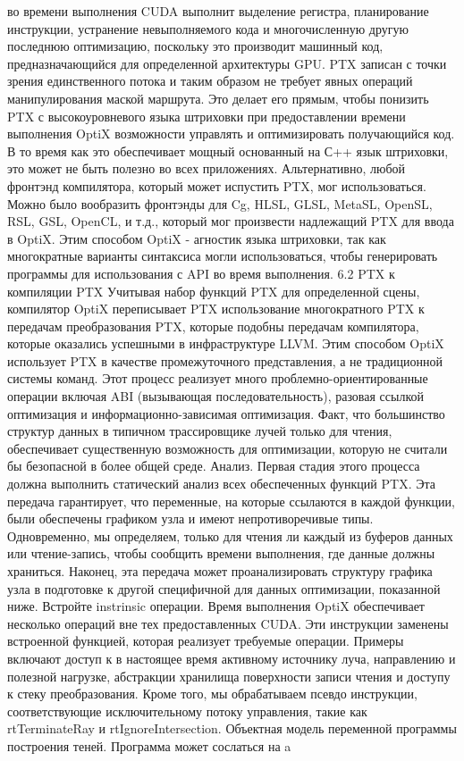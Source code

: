 во времени выполнения CUDA выполнит выделение регистра, планирование инструкции, устранение невыполняемого кода и многочисленную другую последнюю оптимизацию, поскольку это производит машинный код, предназначающийся для определенной архитектуры GPU.
PTX записан с точки зрения единственного потока и таким образом не требует явных операций манипулирования маской маршрута. Это делает его прямым, чтобы понизить PTX с высокоуровневого языка штриховки при предоставлении времени выполнения OptiX возможности управлять и оптимизировать получающийся код. В то время как это обеспечивает мощный основанный на С++ язык штриховки, это может не быть полезно во всех приложениях. Альтернативно, любой фронтэнд компилятора, который может испустить PTX, мог использоваться. Можно было вообразить фронтэнды для Cg, HLSL, GLSL, MetaSL, OpenSL, RSL, GSL, OpenCL, и т.д., который мог произвести надлежащий PTX для ввода в OptiX. Этим способом OptiX - агностик языка штриховки, так как многократные варианты синтаксиса могли использоваться, чтобы генерировать программы для использования с API во время выполнения.
6.2 PTX к компиляции PTX
Учитывая набор функций PTX для определенной сцены, компилятор OptiX переписывает PTX использование многократного PTX к передачам преобразования PTX, которые подобны передачам компилятора, которые оказались успешными в инфраструктуре LLVM. Этим способом OptiX использует PTX в качестве промежуточного представления, а не традиционной системы команд. Этот процесс реализует много
проблемно-ориентированные операции включая ABI (вызывающая последовательность), разовая ссылкой оптимизация и информационно-зависимая оптимизация. Факт, что большинство структур данных в типичном трассировщике лучей только для чтения, обеспечивает существенную возможность для оптимизации, которую не считали бы безопасной в более общей среде. Анализ. Первая стадия этого процесса должна выполнить статический анализ всех обеспеченных функций PTX. Эта передача гарантирует, что переменные, на которые ссылаются в каждой функции, были обеспечены
графиком узла и имеют непротиворечивые типы. Одновременно, мы определяем, только для чтения ли каждый из буферов данных или чтение-запись, чтобы сообщить времени выполнения, где данные должны храниться. Наконец, эта передача может проанализировать структуру графика узла в подготовке к другой специфичной для данных оптимизации, показанной ниже. Встройте instrinsic операции. Время выполнения OptiX обеспечивает несколько операций вне тех предоставленных CUDA. Эти инструкции заменены встроенной функцией, которая реализует требуемые операции. Примеры включают доступ к в настоящее время активному источнику луча, направлению и полезной нагрузке, абстракции хранилища поверхности записи чтения и доступу к стеку преобразования. Кроме того, мы обрабатываем псевдо инструкции, соответствующие исключительному потоку управления, такие как rtTerminateRay и rtIgnoreIntersection. Объектная модель переменной программы построения теней. Программа может сослаться на a
